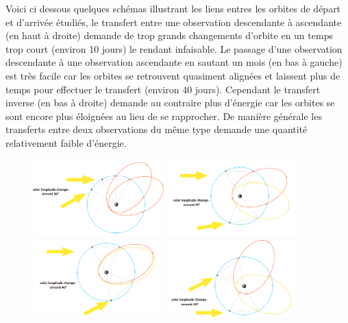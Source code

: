 \documentclass[11pt]{article} %
\begin{document}
		Voici ci dessous quelques schémas illustrant les liens entres les orbites de départ et d'arrivée étudiés, le transfert entre une observation descendante à ascendante (en haut à droite) demande de trop grands changements d'orbite en un temps trop court (environ 10 jours) le rendant infaisable. Le passage d'une observation descendante à une observation ascendante en sautant un mois (en bas à gauche) est très facile car les orbites se retrouvent quasiment alignées et laissent plus de temps pour effectuer le transfert (environ 40 jours). Cependant le transfert inverse (en bas à droite) demande au contraire plus d'énergie car les orbites se sont encore plus éloignées au lieu de se rapprocher. De manière générale les transferts entre deux observations du même type demande une quantité relativement faible d'énergie.
		\begin{figure}[H]
			\centering
			\includegraphics[width=0.45\textwidth]{images/1in2obs.png}
			\includegraphics[width=0.45\textwidth]{images/odd_to_even.png}
			\includegraphics[width=0.45\textwidth]{images/1in3_obs.png}
			\includegraphics[width=0.45\textwidth]{images/1in3_bad.png}
		\end{figure}
		
\end{document}
